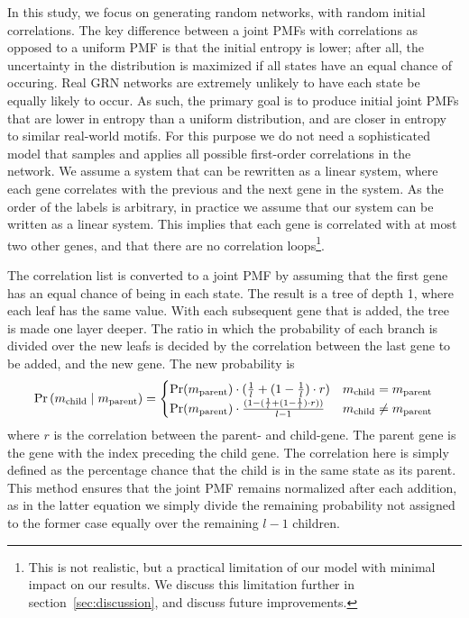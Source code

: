 \documentclass[../main.tex]{subfiles}
\begin{document}
In this study, we focus on generating random networks, with random initial correlations.
The key difference between a joint PMFs with correlations as opposed to a uniform PMF is that the initial entropy is lower; after all, the uncertainty in the distribution is maximized if all states have an equal chance of occuring.
Real GRN networks are extremely unlikely to have each state be equally likely to occur.
As such, the primary goal is to produce initial joint PMFs that are lower in entropy than a uniform distribution, and are closer in entropy to similar real-world motifs. 
For this purpose we do not need a sophisticated model that samples and applies all possible first-order correlations in the network.
We assume a system that can be rewritten as a linear system, where each gene correlates with the previous and the next gene in the system.
As the order of the labels is arbitrary, in practice we assume that our system can be written as a linear system.
This implies that each gene is correlated with at most two other genes, and that there are no correlation loops\footnote{This is not realistic, but a practical limitation of our model with minimal impact on our results. We discuss this limitation further in section~\ref{sec:discussion}, and discuss future improvements.}.

The correlation list is converted to a joint PMF by assuming that the first gene has an equal chance of being in each state.
The result is a tree of depth 1, where each leaf has the same value.
With each subsequent gene that is added, the tree is made one layer deeper.
The ratio in which the probability of each branch is divided over the new leafs is decided by the correlation between the last gene to be added, and the new gene.
The new probability is
%
\begin{equation}
\label{parentchild}
 \Pr\left( m_\mathrm{child} \;\middle|\; m_\mathrm{parent} \right) = 
    \begin{cases} 
    \Pr(m_\mathrm{parent}) \cdot (\frac{1}{l} + (1 - \frac{1}{l}) \cdot r) &  m_\mathrm{child} = m_\mathrm{parent} \\
    \Pr(m_\mathrm{parent}) \cdot \frac{(1 - (\frac{1}{l} + (1 - \frac{1}{l}) \cdot r))}{l-1} &  m_\mathrm{child} \neq m_\mathrm{parent} \\
    \end{cases}
\end{equation}
%
where $r$ is the correlation between the parent- and child-gene.
The parent gene is the gene with the index preceding the child gene.
The correlation here is simply defined as the percentage chance that the child is in the same state as its parent.
This method ensures that the joint PMF remains normalized after each addition, as in the latter equation we simply divide the remaining probability not assigned to the former case equally over the remaining $l-1$ children.
\end{document}
